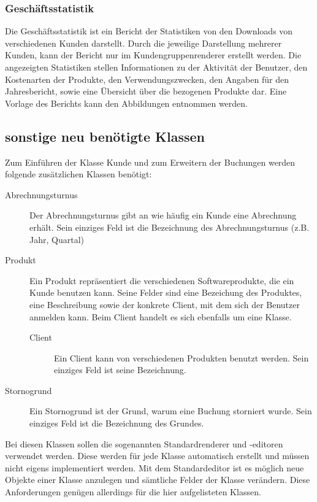 \subsubsection{Geschäftsstatistik}
Die Geschäftsstatistik ist ein Bericht der Statistiken von den Downloads von verschiedenen Kunden darstellt.
Durch die jeweilige Darstellung mehrerer Kunden, kann der Bericht nur im Kundengruppenrenderer erstellt werden.
Die angezeigten Statistiken stellen Informationen zu der Aktivität der Benutzer, den Kostenarten der Produkte, den Verwendungszwecken, den Angaben für den Jahresbericht, sowie eine Übersicht über die bezogenen Produkte dar.
Eine Vorlage des Berichts kann den Abbildungen  entnommen werden.
 
\subsection{sonstige neu benötigte Klassen} \label{subsec:neue_klassen}
Zum Einführen der Klasse Kunde und zum Erweitern der Buchungen werden folgende zusätzlichen Klassen benötigt:
\begin{description}
\item[Abrechnungsturnus] Der Abrechnungsturnus gibt an wie häufig ein Kunde eine Abrechnung erhält. Sein einziges Feld ist die Bezeichnung des Abrechnungsturnus (z.B. Jahr, Quartal)
\item[Produkt] Ein Produkt repräsentiert die verschiedenen Softwareprodukte, die ein Kunde benutzen kann. Seine Felder sind eine Bezeichung des Produktes, eine Beschreibung sowie der konkrete Client, mit dem sich der Benutzer anmelden kann. Beim Client handelt es sich ebenfalls um eine Klasse.
\begin{description}
\item[Client] Ein Client kann von verschiedenen Produkten benutzt werden. Sein einziges Feld ist seine Bezeichnung.
\end{description}
\item[Stornogrund] Ein Stornogrund ist der Grund, warum eine Buchung storniert wurde. Sein einziges Feld ist die Bezeichnung des Grundes.
\end{description}

Bei diesen Klassen sollen die sogenannten Standardrenderer und -editoren verwendet werden. Diese werden für jede Klasse automatisch erstellt und müssen nicht eigens implementiert werden.
Mit dem Standardeditor ist es möglich neue Objekte einer Klasse anzulegen und sämtliche Felder der Klasse verändern.
Diese Anforderungen genügen allerdings für die hier aufgelisteten Klassen.



